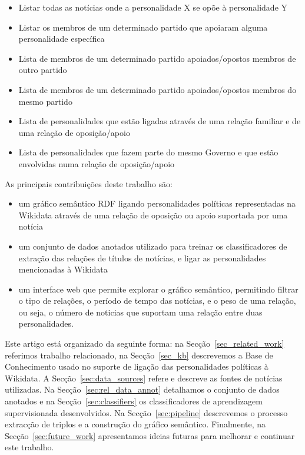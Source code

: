 \documentclass[a4paper, twocolumn, 11pt, twoside]{article}
\begin{document}
\begin{itemize}
\item{Listar todas as notícias onde a personalidade X se opõe à personalidade Y}
\item{Listar os membros de um determinado partido que apoiaram alguma personalidade específica}
\item{Lista de membros de um determinado partido apoiados/opostos membros de outro partido}
\item{Lista de membros de um determinado partido apoiados/opostos membros do mesmo partido}
\item{Lista de personalidades que estão ligadas através de uma relação familiar e de uma relação de oposição/apoio}
\item{Lista de personalidades que fazem parte do mesmo Governo e que estão envolvidas numa relação de oposição/apoio}
\end{itemize}

As principais contribuições deste trabalho são: 

\begin{itemize}
\item{um gráfico semântico RDF ligando personalidades políticas representadas na Wikidata através de uma relação de oposição ou apoio suportada por uma notícia}
\item{um conjunto de dados anotados utilizado para treinar os classificadores de extração das relações de títulos de notícias, e ligar as personalidades mencionadas à Wikidata}
\item{um interface web que permite explorar o gráfico semântico, permitindo filtrar o tipo de relações, o período de tempo das notícias, e o peso de uma relação, ou seja, o número de noticias que suportam uma relação entre duas personalidades.}
\end{itemize}

Este artigo está organizado da seguinte forma: na Secção~\ref{sec_related_work} referimos trabalho relacionado, na Secção~\ref{sec_kb} descrevemos a Base de Conhecimento usado no suporte de ligação das personalidades políticas à Wikidata. A Secção~\ref{sec:data_sources} refere e descreve as fontes de notícias utilizadas. Na Secção~\ref{sec:rel_data_annot} detalhamos o conjunto de dados anotados e na Secção~\ref{sec:classifiers} os classificadores de aprendizagem supervisionada desenvolvidos. Na Secção~\ref{sec:pipeline} descrevemos o processo extracção de triplos e a construção do gráfico semântico. Finalmente, na Secção~\ref{sec:future_work} apresentamos ideias futuras para melhorar e continuar este trabalho.
\end{document}
